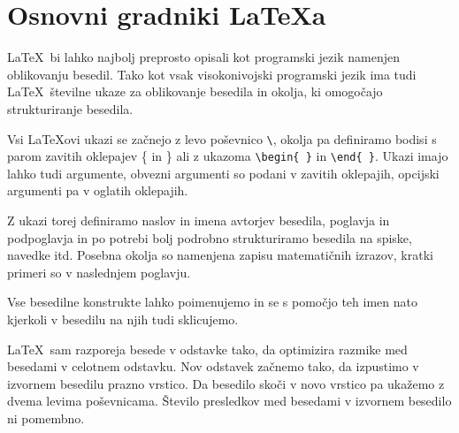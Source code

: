 \chapter{Osnovni gradniki \LaTeX{a}}

\LaTeX\ bi lahko najbolj preprosto opisali kot programski jezik namenjen oblikovanju besedil.
Tako kot vsak visokonivojski programski jezik ima tudi \LaTeX\ številne ukaze za oblikovanje
besedila in okolja, ki omogočajo strukturiranje besedila.

Vsi \LaTeX ovi ukazi se začnejo z levo poševnico \verb=\=, okolja pa definiramo bodisi s parom
zavitih oklepajev \{ in \} ali z ukazoma \verb=\begin{ }= in \verb=\end{ }=.
Ukazi imajo lahko tudi argumente, obvezni argumenti so podani v zavitih oklepajih, opcijski
argumenti pa v oglatih oklepajih.

Z ukazi torej definiramo naslov in imena avtorjev besedila, poglavja in podpoglavja in po
potrebi bolj podrobno strukturiramo besedila na spiske, navedke itd.
Posebna okolja so namenjena zapisu matematičnih izrazov, kratki primeri so v naslednjem poglavju.

Vse besedilne konstrukte lahko poimenujemo in se s pomočjo teh imen nato kjerkoli v besedilu
na njih tudi sklicujemo.

\LaTeX\ sam razporeja besede v odstavke tako, da optimizira razmike med besedami v celotnem odstavku.
Nov odstavek začnemo tako, da izpustimo v izvornem besedilu prazno vrstico. Da besedilo skoči
v novo vrstico pa ukažemo z dvema levima poševnicama.
Število presledkov med besedami v izvornem besedilo ni pomembno.
